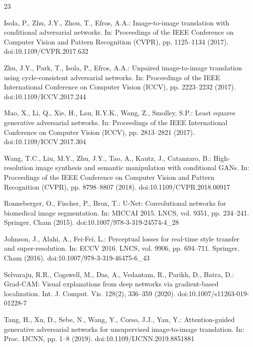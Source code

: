 \documentclass[runningheads]{llncs}
\begin{document}

\begin{thebibliography}{23}

Isola, P., Zhu, J.Y., Zhou, T., Efros, A.A.: Image-to-image translation with conditional adversarial networks. In: Proceedings of the IEEE Conference on Computer Vision and Pattern Recognition (CVPR), pp. 1125--1134 (2017). doi:10.1109/CVPR.2017.632

Zhu, J.Y., Park, T., Isola, P., Efros, A.A.: Unpaired image-to-image translation using cycle-consistent adversarial networks. In: Proceedings of the IEEE International Conference on Computer Vision (ICCV), pp. 2223--2232 (2017). doi:10.1109/ICCV.2017.244

Mao, X., Li, Q., Xie, H., Lau, R.Y.K., Wang, Z., Smolley, S.P.: Least squares generative adversarial networks. In: Proceedings of the IEEE International Conference on Computer Vision (ICCV), pp. 2813--2821 (2017). doi:10.1109/ICCV.2017.304

Wang, T.C., Liu, M.Y., Zhu, J.Y., Tao, A., Kautz, J., Catanzaro, B.: High-resolution image synthesis and semantic manipulation with conditional GANs. In: Proceedings of the IEEE Conference on Computer Vision and Pattern Recognition (CVPR), pp. 8798--8807 (2018). doi:10.1109/CVPR.2018.00917

Ronneberger, O., Fischer, P., Brox, T.: U-Net: Convolutional networks for biomedical image segmentation. In: MICCAI 2015. LNCS, vol. 9351, pp. 234--241. Springer, Cham (2015). doi:10.1007/978-3-319-24574-4\_28

Johnson, J., Alahi, A., Fei-Fei, L.: Perceptual losses for real-time style transfer and super-resolution. In: ECCV 2016. LNCS, vol. 9906, pp. 694--711. Springer, Cham (2016). doi:10.1007/978-3-319-46475-6\_43

Selvaraju, R.R., Cogswell, M., Das, A., Vedantam, R., Parikh, D., Batra, D.: Grad-CAM: Visual explanations from deep networks via gradient-based localization. Int. J. Comput. Vis. 128(2), 336--359 (2020). doi:10.1007/s11263-019-01228-7

Tang, H., Xu, D., Sebe, N., Wang, Y., Corso, J.J., Yan, Y.: Attention-guided generative adversarial networks for unsupervised image-to-image translation. In: Proc. IJCNN, pp. 1--8 (2019). doi:10.1109/IJCNN.2019.8851881


\end{thebibliography}
\end{document}
